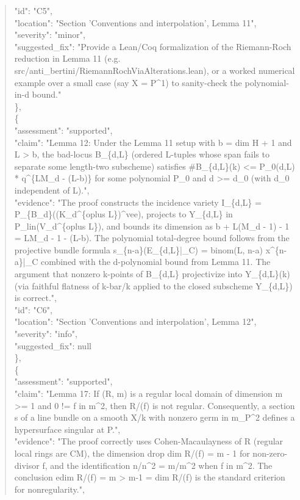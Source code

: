 \documentclass[11pt]{article}
\begin{document}
\begin{quote}
      "id": "C5",\\
      "location": "Section 'Conventions and interpolation', Lemma 11",\\
      "severity": "minor",\\
      "suggested\_fix": "Provide a Lean/Coq formalization of the Riemann-Roch reduction in Lemma 11 (e.g. src/anti\_bertini/RiemannRochViaAlterations.lean), or a worked numerical example over a small case (say X = P\^{}1) to sanity-check the polynomial-in-d bound."\\
    \},\\
    \{\\
      "assessment": "supported",\\
      "claim": "Lemma 12: Under the Lemma 11 setup with b = dim H + 1 and L > b, the bad-locus B\_\{d,L\} (ordered L-tuples whose span fails to separate some length-two subscheme) satisfies \#B\_\{d,L\}(k) <= P\_0(d,L) * q\^{}\{LM\_d - (L-b)\} for some polynomial P\_0 and d >= d\_0 (with d\_0 independent of L).",\\
      "evidence": "The proof constructs the incidence variety I\_\{d,L\} = P\_\{B\_d\}((K\_d\^{}\{oplus L\})\^{}vee), projects to Y\_\{d,L\} in P\_lin(V\_d\^{}\{oplus L\}), and bounds its dimension as b + L(M\_d - 1) - 1 = LM\_d - 1 - (L-b). The polynomial total-degree bound follows from the projective bundle formula s\_\{n-a\}(E\_\{d,L\}|\_C) = binom(L, n-a) x\^{}\{n-a\}|\_C combined with the d-polynomial bound from Lemma 11. The argument that nonzero k-points of B\_\{d,L\} projectivize into Y\_\{d,L\}(k) (via faithful flatness of k-bar/k applied to the closed subscheme Y\_\{d,L\}) is correct.",\\
      "id": "C6",\\
      "location": "Section 'Conventions and interpolation', Lemma 12",\\
      "severity": "info",\\
      "suggested\_fix": null\\
    \},\\
    \{\\
      "assessment": "supported",\\
      "claim": "Lemma 17: If (R, m) is a regular local domain of dimension m >= 1 and 0 != f in m\^{}2, then R/(f) is not regular. Consequently, a section s of a line bundle on a smooth X/k with nonzero germ in m\_P\^{}2 defines a hypersurface singular at P.",\\
      "evidence": "The proof correctly uses Cohen-Macaulayness of R (regular local rings are CM), the dimension drop dim R/(f) = m - 1 for non-zero-divisor f, and the identification n/n\^{}2 = m/m\^{}2 when f in m\^{}2. The conclusion edim R/(f) = m > m-1 = dim R/(f) is the standard criterion for nonregularity.",\\

\end{quote}
\end{document}

